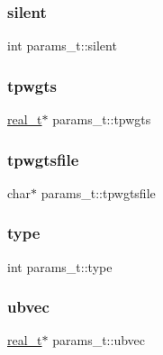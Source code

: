 \subsubsection{\texorpdfstring{silent}{silent}}
{\footnotesize\ttfamily int params\+\_\+t\+::silent}

\mbox{\label{structparams__t_a7fb2014fe23c8ff9c391a97988679a30}} 
\subsubsection{\texorpdfstring{tpwgts}{tpwgts}}
{\footnotesize\ttfamily \hyperlink{3rd_party_2parmetis-4_80_83_2metis_2include_2metis_8h_a1924a4f6907cc3833213aba1f07fcbe9}{real\+\_\+t}$\ast$ params\+\_\+t\+::tpwgts}

\mbox{\label{structparams__t_afa86a2ce3ccb7a178a34e65aa6068c5e}} 
\subsubsection{\texorpdfstring{tpwgtsfile}{tpwgtsfile}}
{\footnotesize\ttfamily char$\ast$ params\+\_\+t\+::tpwgtsfile}

\mbox{\label{structparams__t_a540f3365a30f0d8b20ba70a920b436b9}} 
\subsubsection{\texorpdfstring{type}{type}}
{\footnotesize\ttfamily int params\+\_\+t\+::type}

\mbox{\label{structparams__t_a042ad1cf58d51dbceee5cae31de6f34a}} 
\subsubsection{\texorpdfstring{ubvec}{ubvec}}
{\footnotesize\ttfamily \hyperlink{3rd_party_2parmetis-4_80_83_2metis_2include_2metis_8h_a1924a4f6907cc3833213aba1f07fcbe9}{real\+\_\+t}$\ast$ params\+\_\+t\+::ubvec}

